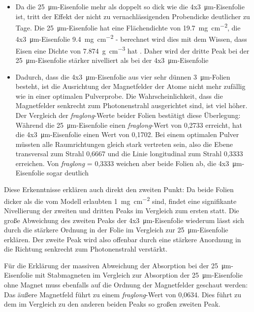 \documentclass[german, %
parskip=full, %
bibliography=totoc, %
]{scrartcl}
\begin{document}
\begin{itemize}
\item Da die \SI{25}{\micro\meter}-Eisenfolie mehr als doppelt so dick wie die 4x\SI{3}{\micro\meter}-Eisenfolie ist, tritt der Effekt der nicht zu vernachlässigenden Probendicke deutlicher zu Tage. Die \SI{25}{\micro\meter}-Eisenfolie hat eine Flächendichte von \SI{19.7}{\milli\gram\per\square\centi\meter}, die 4x\SI{3}{\micro\meter}-Eisenfolie \SI{9.4}{\milli\gram\per\square\centi\meter} - berechnet wird dies mit dem Wissen, dass Eisen eine Dichte von \SI{7.874}{\gram\per\cubic\centi\meter} hat \cite{eisen}. Daher wird der dritte Peak bei der \SI{25}{\micro\meter}-Eisenfolie stärker nivelliert als bei der 4x\SI{3}{\micro\meter}-Eisenfolie
\item Dadurch, dass die 4x\SI{3}{\micro\meter}-Eisenfolie aus vier sehr dünnen \SI{3}{\micro\meter}-Folien besteht, ist die Ausrichtung der Magnetfelder der Atome nicht mehr zufällig wie in einer optimalen Pulverprobe. Die Wahrscheinlichkeit, dass die Magnetfelder senkrecht zum Photonenstrahl ausgerichtet sind, ist viel höher. Der Vergleich der \textit{fraglong}-Werte beider Folien bestätigt diese Überlegung: Während die \SI{25}{\micro\meter}-Eisenfolie einen \textit{fraglong}-Wert von 0,2733 erreicht, hat die 4x\SI{3}{\micro\meter}-Eisenfolie einen Wert von 0,1702. Bei einem optimalen Pulver müssten alle Raumrichtungen gleich stark vertreten sein, also die Ebene transversal zum Strahl 0,6667 und die Linie longitudinal zum Strahl 0,3333 erreichen. Von \textit{fraglong} = 0,3333 weichen aber beide Folien ab, die 4x\SI{3}{\micro\meter}-Eisenfolie sogar deutlich
\end{itemize}
Diese Erkenntnisse erklären auch direkt den zweiten Punkt: Da beide Folien dicker als die vom Modell erlaubten \SI{1}{\milli\gram\per\square\centi\meter} sind, findet eine signifikante Nivellierung der zweiten und dritten Peaks im Vergleich zum ersten statt. Die große Abweichung des zweiten Peaks der 4x\SI{3}{\micro\meter}-Eisenfolie wiederum lässt sich durch die stärkere Ordnung in der Folie im Vergleich zur \SI{25}{\micro\meter}-Eisenfolie erklären. Der zweite Peak wird also offenbar durch eine stärkere Anordnung in die Richtung senkrecht zum Photonenstrahl verstärkt.

Für die Erklärung der massiven Abweichung der Absorption bei der \SI{25}{\micro\meter}-Eisenfolie mit Stabmagneten im Vergleich zur Absorption der \SI{25}{\micro\meter}-Eisenfolie ohne Magnet muss ebenfalls auf die Ordnung der Magnetfelder geschaut werden: Das äußere Magnetfeld führt zu einem \textit{fraglong}-Wert von 0,0634. Dies führt zu dem im Vergleich zu den anderen beiden Peaks so großen zweiten Peak.
\end{document}
